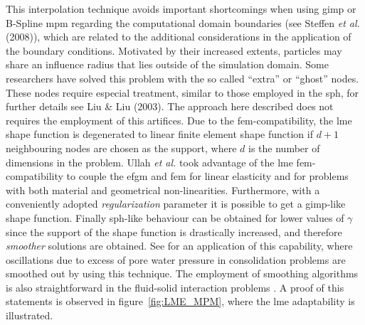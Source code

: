 \documentclass[preprint,12pt,a4paper]{elsarticle}
\begin{document}
This interpolation technique avoids important shortcomings when using
\acrshort{gimp} or B-Spline \acrshort{mpm} regarding the computational domain boundaries
(see Steffen {\it et al.} (2008)\cite{Steffen2008b}), which are related to the
additional considerations in the application of the boundary
conditions. Motivated by their increased extents, particles may share an influence radius that lies outside of the simulation domain. Some researchers have solved this problem with the so called ``extra'' or ``ghost'' nodes. These nodes require especial treatment, similar
to those employed in the \acrfull{sph}, for
further details see Liu \& Liu (2003)\cite{Liu2003}. The approach here
described does not requires the employment of this artifices.
Due to the \acrshort{fem}-compatibility, the \acrshort{lme} shape
function is degenerated to linear finite element shape function if
$d+1$ neighbouring nodes are chosen as the support, where $d$ is the
number of dimensions in the problem. Ullah {\it et al.} \cite{Augarde_2013} took advantage of the \acrshort{lme} \acrshort{fem}-compatibility to couple the \acrfull{efgm} and \acrshort{fem} for linear elasticity and for problems with both material and geometrical non-linearities. Furthermore, with a conveniently
adopted \textit{regularization} parameter it is possible to get a 
\acrshort{gimp}-like shape function. Finally \acrshort{sph}-like
behaviour can be obtained for lower values of $\gamma$ since the
support of the shape function is drastically increased, and therefore
\textit{smoother} solutions are obtained. See \cite{Navas2016} for an
application of this capability, where oscillations due to
excess of pore water pressure in consolidation problems are smoothed
out by using this technique. The employment of smoothing algorithms is
also straightforward in the fluid-solid interaction problems
\cite{Arduino_2018}. A proof of this statements is observed in
figure~\ref{fig:LME_MPM}, where the \acrshort{lme} adaptability is illustrated.\\
\end{document}
